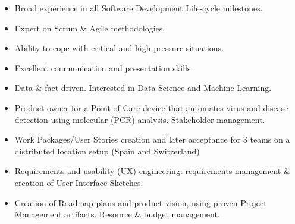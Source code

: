 \documentclass[10pt,a4paper]{altacv}
\begin{document}

\begin{fullwidth}
\makecvheader
\end{fullwidth}


\begin{itemize} 
	\item Broad experience in all Software Development Life-cycle milestones.
	\item Expert on Scrum \& Agile methodologies.
	\item Ability to cope with critical and high pressure situations.              
	\item Excellent communication and presentation skills.
	\item Data \& fact driven. Interested in Data Science and Machine Learning.
\end{itemize}

\medskip


\begin{itemize}
	\item Product owner for a Point of Care device that automates virus and disease detection using molecular (PCR) analysis. Stakeholder management.
	\item Work Packages/User Stories creation and later acceptance for 3 teams on a distributed location setup (Spain and Switzerland)
	\item Requirements and usability (UX) engineering: requirements management \& creation of User Interface Sketches.
	\item Creation of Roadmap plans and product vision, using proven Project Management artifacts. Resource \& budget management.
\end{itemize}
\end{document}
